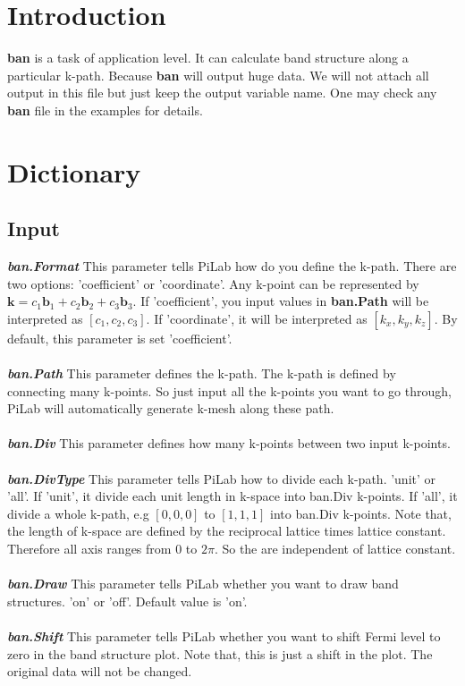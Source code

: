 \documentclass[10pt,a4paper]{article}
\begin{document}
\section{Introduction}
\textbf{ban} is a task of application level. It can calculate band structure along a particular k-path. Because \textbf{ban} will output huge data. We will not attach all output in this file but just keep the output variable name. One may check any \textbf{ban} file in the examples for details. 

\section{Dictionary}

\subsection{Input}
\textit{\textbf{ban.Format}} This parameter tells PiLab how do you define the k-path. There are two options: 'coefficient' or 'coordinate'. Any k-point can be represented by $\textbf{k}=c_{1}\textbf{b}_{1}+c_{2}\textbf{b}_{2}+c_{3}\textbf{b}_{3}$. If 'coefficient', you input values in \textbf{ban.Path} will be interpreted as $[c_{1},c_{2},c_{3}]$. If 'coordinate', it will be interpreted as $[k_{x},k_{y},k_{z}]$. By default, this parameter is set 'coefficient'. \\ \\
\textit{\textbf{ban.Path}} This parameter defines the k-path. The k-path is defined by connecting many k-points. So just input all the k-points you want to go through, PiLab will automatically generate k-mesh along these path.\\ \\
\textit{\textbf{ban.Div}} This parameter defines how many k-points between two input k-points.\\ \\
\textit{\textbf{ban.DivType}} This parameter tells PiLab how to divide each k-path. 'unit' or 'all'. If 'unit', it divide each unit length in k-space into ban.Div k-points. If 'all', it divide a whole k-path, e.g $[0,0,0]$ to $[1,1,1]$ into ban.Div k-points. Note that, the length of k-space are defined by the reciprocal lattice times lattice constant. Therefore all axis ranges from 0 to $2\pi$. So the are independent of lattice constant.\\ \\
\textit{\textbf{ban.Draw}} This parameter tells PiLab whether you want to draw band structures. 'on' or 'off'. Default value is 'on'.\\ \\
\textit{\textbf{ban.Shift}} This parameter tells PiLab whether you want to shift Fermi level to zero in the band structure plot. Note that, this is just a shift in the plot. The original data will not be changed. 
\end{document}
